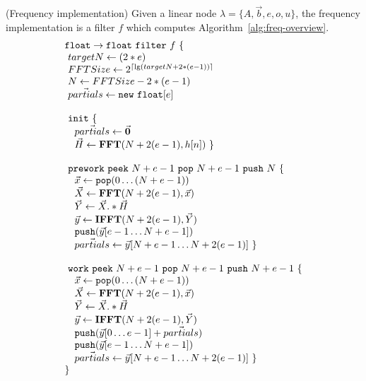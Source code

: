 \begin{transformation} (Frequency implementation)
Given a linear node $\lambda = \{A, {\vec b}, e, o, u\}$, 
the frequency implementation is a filter $f$ which
computes Algorithm~\ref{alg:freq-overview}. 
\\
\begin{equation} \nonumber
  \begin{array}{l}
    {\tt float \rightarrow float}~{\tt filter}~f~{\tt \{} \\
    ~targetN        \leftarrow (2*e) \\
    ~FFTSize        \leftarrow 2^{\lceil \lg(targetN + 2*(e-1)) \rceil} \\
    ~N              \leftarrow FFTSize - 2*(e-1) \\ 
    ~\vec{partials} \leftarrow {\tt new~float}[e] \\
    \\
    ~{\tt init}~{\tt \{} \\
    ~~~\vec{partials} \leftarrow \vec{\mathbf{0}} \\
    ~~~\vec{H} \leftarrow \mathbf{FFT}(N+2(e-1),h[n])~{\tt \}} \\
    \\
    ~{\tt prework}~{\tt peek}~N+e-1~{\tt pop}~N+e-1~{\tt push}~N~{\tt \{}\\
    ~~~\vec{x} \leftarrow {\tt pop}(0 \dots (N+e-1)) \\
    ~~~\vec{X} \leftarrow \mathbf{FFT} (N+2(e-1), \vec{x}) \\
    ~~~\vec{Y} \leftarrow \vec{X} .* \vec{H} \\
    ~~~\vec{y} \leftarrow \mathbf{IFFT}(N+2(e-1), \vec{Y}) \\
    ~~~{\tt push}(\vec{y}[e-1 \dots N+e-1]) \\
    ~~~\vec{partials} \leftarrow \vec{y}[N+e-1 \dots N+2(e-1)]~{\tt \}} \\
    \\
    ~{\tt work}~{\tt peek}~N+e-1~{\tt pop}~N+e-1~{\tt push}~N+e-1~{\tt \{} \\
    ~~~\vec{x} \leftarrow {\tt pop}(0 \dots (N+e-1)) \\
    ~~~\vec{X} \leftarrow \mathbf{FFT} (N+2(e-1), \vec{x}) \\
    ~~~\vec{Y} \leftarrow \vec{X} .* \vec{H} \\
    ~~~\vec{y} \leftarrow \mathbf{IFFT}(N+2(e-1), \vec{Y}) \\
    ~~~{\tt push}(\vec{y}[0 \dots e-1] + \vec{partials})\\
    ~~~{\tt push}(\vec{y}[e-1 \dots N+e-1]) \\
    ~~~\vec{partials} \leftarrow \vec{y}[N+e-1 \dots N+2(e-1)]~{\tt \}} \\
    {\tt \}}
  \end{array} \\
\end{equation}
\label{trans:freq}
\end{transformation}



